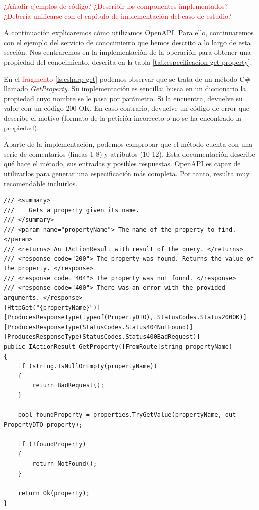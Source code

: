\textcolor{red}{¿Añadir ejemplos de código? ¿Describir los componentes implementados? ¿Debería unificarse con el capítulo de implementación del caso de estudio?}


A continuación explicaremos cómo utilizamos OpenAPI. Para ello, continuaremos con el ejemplo del servicio de conocimiento que hemos descrito a lo largo de esta sección. Nos centraremos en la implementación de la operación para obtener una propiedad del conocimiento, descrita en la tabla \ref{tab:especificacion-get-property}.

En el \textcolor{red}{fragmento} \ref{ls:csharp-get} podemos observar que se trata de un método C\# llamado \emph{GetProperty}. Su implementación es sencilla: busca en un diccionario la propiedad cuyo nombre se le pasa por parámetro. Si la encuentra, devuelve su valor con un código 200 OK. En caso contrario, devuelve un código de error que describe el motivo (formato de la petición incorrecto o no se ha encontrado la propiedad).

Aparte de la implementación, podemos comprobar que el método cuenta con una serie de comentarios (líneas 1-8) y atributos (10-12). Esta documentación describe qué hace el método, sus entradas y posibles respuestas. OpenAPI es capaz de utilizarlos para generar una especificación más completa. Por tanto, resulta muy recomendable incluirlos.

\begin{lstlisting}[language={[Sharp]C},caption={Implementación del método GetProperty decorado para generar la especificación OpenAPI.},captionpos=b, label=ls:csharp-get]
/// <summary>
///    Gets a property given its name.
/// </summary>
/// <param name="propertyName"> The name of the property to find. </param>
/// <returns> An IActionResult with result of the query. </returns>
/// <response code="200"> The property was found. Returns the value of the property. </response>
/// <response code="404"> The property was not found. </response>
/// <response code="400"> There was an error with the provided arguments. </response>
[HttpGet("{propertyName}")]
[ProducesResponseType(typeof(PropertyDTO), StatusCodes.Status200OK)]
[ProducesResponseType(StatusCodes.Status404NotFound)]
[ProducesResponseType(StatusCodes.Status400BadRequest)]
public IActionResult GetProperty([FromRoute]string propertyName)
{
    if (string.IsNullOrEmpty(propertyName))
    {
        return BadRequest();
    }

    bool foundProperty = properties.TryGetValue(propertyName, out PropertyDTO property);

    if (!foundProperty)
    {
        return NotFound();
    }

    return Ok(property);
}
\end{lstlisting}

